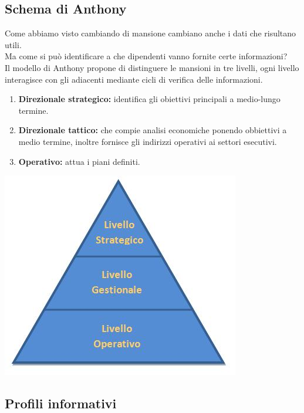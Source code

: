 \documentclass{book}
\begin{document}
    \subsection{Schema di Anthony}
    Come abbiamo visto cambiando di mansione cambiano anche i dati che risultano utili.\\
    Ma come si può identificare a che dipendenti vanno fornite certe informazioni?\\
    Il modello di Anthony propone di distinguere le mansioni in tre livelli, ogni livello interagisce con gli adiacenti mediante cicli di verifica delle informazioni.
    \begin{enumerate}
        \item \textbf{Direzionale strategico:} identifica gli obiettivi principali a medio-lungo termine.
        \item \textbf{Direzionale tattico:} che compie analisi economiche ponendo obbiettivi a medio termine, inoltre fornisce gli indirizzi operativi ai settori esecutivi.
        \item \textbf{Operativo:} attua i piani definiti.
    \end{enumerate}
    \begin{center}
        \includegraphics[scale=0.5]{anthony_mark_01.jpg}
    \end{center}

    \subsection{Profili informativi}
\end{document}
